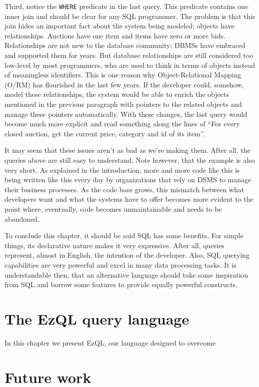 \documentclass{report}
\begin{document}
Third, notice the \verb=WHERE= predicate in the last query. This
predicate contains one inner join and should be clear for any SQL
programmer. The problem is that this join hides an important fact
about the system being modeled: objects have relationships. Auctions
have one item and items have zero or more bids. Relationships are not
new to the database community: DBMSs have embraced and supported them
for years. But database relationships are still considered too
low-level by most programmers, who are used to think in terms of
objects instead of meaningless identifiers. This is one reason why
Object-Relational Mapping (O/RM) has flourished in the last few
years. If the developer could, somehow, model these relationships, the
system would be able to enrich the objects mentioned in the previous
paragraph with pointers to the related objects and manage these
pointers automatically. With these changes, the last query would
become much more explicit and read something along the lines of ``For
every closed auction, get the current price, category and id of its
item''.

It may seem that these issues aren't as bad as we're making
them. After all, the queries above are still easy to understand. Note
however, that the example is also very short. As explained in the
introduction, more and more code like this is being written like this
every day by organizations that rely on DSMS to manage their business
processes. As the code base grows, this mismatch between what
developers want and what the systems have to offer becomes more
evident to the point where, eventually, code becomes unmaintainable
and needs to be abandoned.


To conclude this chapter, it should be said SQL has some benefits. For
simple things, its declarative nature makes it very expressive. After
all, queries represent, almost in English, the intention of the
developer. Also, SQL querying capabilities are very powerful and excel
in many data processing tasks. It is understandable then, that an
alternative language should take some inspiration from SQL and borrow
some features to provide equally powerful constructs.


\chapter{The EzQL query language}
\label{chap:ezql}

In this chapter we present EzQL, our language designed to overcome 

\chapter{Future work}
\label{chap:future-work}
\end{document}
